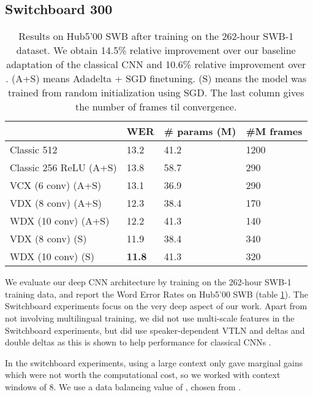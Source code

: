 \documentclass{article}
\begin{document}
\subsection{Switchboard 300}
\label{ssec:swb}
\begin{table}[ht]
\centering
\begin{tabular}{| l | l | l | l |}
    \hline
    & WER &  \# params (M) & \#M frames\\ \hline
    Classic 512 \cite{soltau2014joint}      & 13.2  & 41.2 & 1200 \\
\hline
    Classic 256 ReLU (A+S)                        & 13.8  & 58.7 & 290 \\
    VCX (6 conv) (A+S)                            & 13.1  & 36.9 & 290 \\
    VDX (8 conv) (A+S)                            & 12.3  & 38.4 & 170 \\ WDX (10 conv) (A+S)                           & 12.2  & 41.3 & 140 \\ \hline
    VDX (8 conv) (S)                        & 11.9  & 38.4 & 340 \\  WDX (10 conv) (S)                       & \bf{11.8}  & 41.3 & 320 \\  \hline
\end{tabular}
\caption{\label{tab:hub5}Results on Hub5'00 SWB after training on the 262-hour SWB-1 dataset.
    We obtain 14.5\% relative improvement
    over our baseline adaptation of the classical CNN
    and 10.6\% relative improvement over \cite{soltau2014joint}.
    (A+S) means Adadelta + SGD finetuning. 
    (S) means the model was trained from random initialization using SGD.
    The last column gives the number of frames til convergence.
}
\end{table}

We evaluate our deep CNN architecture by training on the 262-hour SWB-1 training data,
and report the Word Error Rates on Hub5'00 SWB (table \ref{tab:hub5}).
The Switchboard experiments focus on the very deep aspect of our work.
Apart from not involving multilingual training,
we did not use multi-scale features in the Switchboard experiments, 
but did use speaker-dependent VTLN and deltas and double deltas as this is shown to help
performance for classical CNNs \cite{sainath2013deep}.

In the switchboard experiments, using a large context only gave marginal gains
which were not worth the computational cost,
so we worked with context windows of 8.
We use a data balancing value of , 
chosen from .
\end{document}
